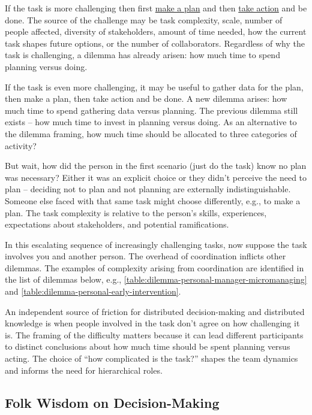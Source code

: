 If the task is more challenging then first \underline{make a plan} and then \underline{take action} and be done. 
The source of the challenge may be task complexity, scale, number of people affected, diversity of stakeholders, amount of time needed, how the current task shapes future options, or the number of collaborators. Regardless of why the task is challenging, a dilemma has already arisen: how much time to spend planning versus doing. 

If the task is even more challenging, it may be useful to gather data for the plan, then make a plan, then take action and be done. A new dilemma arises: how much time to spend gathering data versus planning. The previous dilemma still exists -- how much time to invest in planning versus doing. 
As an alternative to the dilemma framing, how much time should be allocated to three categories of activity?

But wait, how did the person in the first scenario (just do the task) know no plan was necessary? Either it was an explicit choice or they didn't perceive the need to plan -- deciding not to plan and not planning are externally indistinguishable. Someone else faced with that same task might choose differently, e.g., to make a plan. The task complexity is relative to the person's skills, experiences, expectations about stakeholders, and potential ramifications.

In this escalating sequence of increasingly challenging tasks, now suppose the task involves you and another person. The overhead of coordination inflicts other dilemmas. The examples of complexity arising from coordination are identified in the list of dilemmas below, e.g., \ref{table:dilemma-personal-manager-micromanaging} and \ref{table:dilemma-personal-early-intervention}.

An independent source of friction for distributed decision-making and distributed knowledge is when people involved in the task don't agree on how challenging it is. The framing of the difficulty matters because it can lead different participants to distinct conclusions about how much time should be spent planning versus acting. The choice of ``how complicated is the task?'' shapes the team dynamics and informs the need for hierarchical roles. 

\subsection*{Folk Wisdom on Decision-Making}

